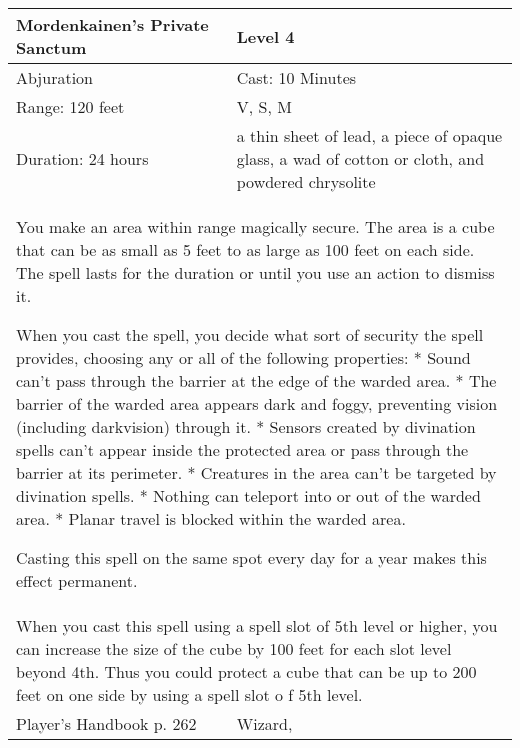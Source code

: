 \documentclass[11pt]{report}
\begin{document}
\begin{table}[H]
	\begin{tabular}{||p{6cm}|p{6cm}||}
		\hline\hline
		\bf{Mordenkainen’s Private Sanctum} & Level 4\\ \hline
		Abjuration & Cast: 10 Minutes\\ \hline
		Range: 120 feet & V, S, M\\ \hline
		Duration: 24 hours & a thin sheet of lead, a piece of opaque glass, a wad of cotton or cloth, and powdered chrysolite\\ \hline
		\multicolumn{2}{||p{12cm}||}{You make an area within range magically secure.
The area is a cube that can be as small as 5 feet to as large as 100 feet on each side. The spell lasts for the duration or until you use an action to dismiss it.

When you cast the spell, you decide what sort of security the spell provides, choosing any or all of the following properties:
* Sound can’t pass through the barrier at the edge of the warded area.
* The barrier of the warded area appears dark and foggy, preventing vision (including darkvision) through it.
* Sensors created by divination spells can’t appear inside the protected area or pass through the barrier at its perimeter.
* Creatures in the area can’t be targeted by divination spells.
* Nothing can teleport into or out of the warded area.
* Planar travel is blocked within the warded area.

Casting this spell on the same spot every day for a year makes this effect permanent.}\\ \hline
		\multicolumn{2}{||p{12cm}||}{When you cast this spell using a spell slot of 5th level or higher, you can increase the size of the cube by 100 feet for each slot level beyond 4th. Thus you could protect a cube that can be up to 200 feet on one side by using a spell slot o f 5th level.}\\ \hline
Player's Handbook p. 262 & Wizard, \\ \hline\hline
	\end{tabular}
\end{table}
\end{document}
